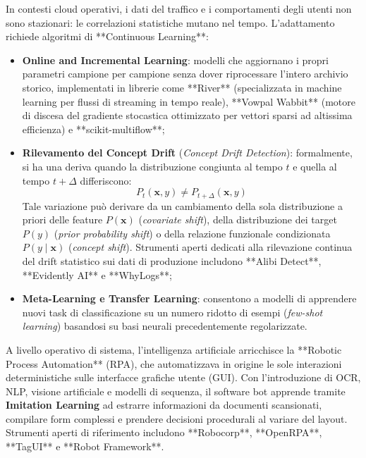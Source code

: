\documentclass[11pt, a4paper]{article}
\begin{document}
In contesti cloud operativi, i dati del traffico e i comportamenti degli utenti non sono stazionari: le correlazioni statistiche mutano nel tempo. L'adattamento richiede algoritmi di **Continuous Learning**:
\begin{itemize}
    \item \textbf{Online and Incremental Learning}: modelli che aggiornano i propri parametri campione per campione senza dover riprocessare l'intero archivio storico, implementati in librerie come **River** (specializzata in machine learning per flussi di streaming in tempo reale), **Vowpal Wabbit** (motore di discesa del gradiente stocastica ottimizzato per vettori sparsi ad altissima efficienza) e **scikit-multiflow**;
    \item \textbf{Rilevamento del Concept Drift} (\emph{Concept Drift Detection}): formalmente, si ha una deriva quando la distribuzione congiunta al tempo $t$ e quella al tempo $t + \Delta$ differiscono:
    \begin{equation}
        P_t(\bm{x}, y) \neq P_{t+\Delta}(\bm{x}, y)
    \end{equation}
    Tale variazione può derivare da un cambiamento della sola distribuzione a priori delle feature $P(\bm{x})$ (\emph{covariate shift}), della distribuzione dei target $P(y)$ (\emph{prior probability shift}) o della relazione funzionale condizionata $P(y \mid \bm{x})$ (\emph{concept shift}). Strumenti aperti dedicati alla rilevazione continua del drift statistico sui dati di produzione includono **Alibi Detect**, **Evidently AI** e **WhyLogs**;
    \item \textbf{Meta-Learning e Transfer Learning}: consentono a modelli di apprendere nuovi task di classificazione su un numero ridotto di esempi (\emph{few-shot learning}) basandosi su basi neurali precedentemente regolarizzate.
\end{itemize}

A livello operativo di sistema, l'intelligenza artificiale arricchisce la **Robotic Process Automation** (RPA), che automatizzava in origine le sole interazioni deterministiche sulle interfacce grafiche utente (GUI). Con l'introduzione di OCR, NLP, visione artificiale e modelli di sequenza, il software bot apprende tramite \textbf{Imitation Learning} ad estrarre informazioni da documenti scansionati, compilare form complessi e prendere decisioni procedurali al variare del layout. Strumenti aperti di riferimento includono **Robocorp**, **OpenRPA**, **TagUI** e **Robot Framework**.

\end{document}
